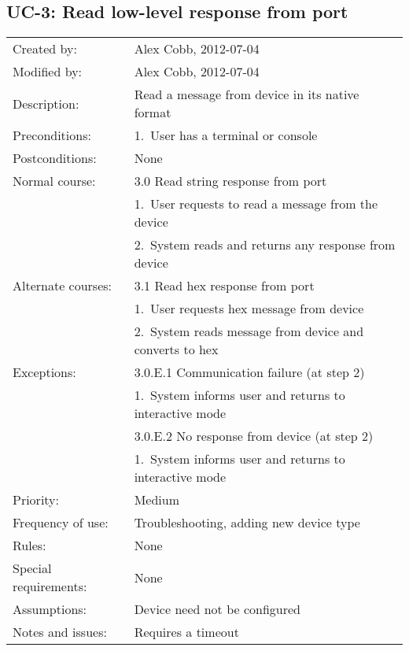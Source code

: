\documentclass[pdftex,oneside,12pt,a4paper]{book}
\begin{document}
\subsection{UC-3: Read low-level response from port}
\begin{tabular}{|l|p{10cm}|}\hline
Created by: & Alex Cobb, 2012-07-04 \\
Modified by: & Alex Cobb, 2012-07-04 \\\hline
Description: & Read a message from device in its native format \\\hline
Preconditions: & 1.\ User has a terminal or console \\\hline
Postconditions: & None \\\hline
Normal course: & 3.0 Read string response from port\\
 & 1.\ User requests to read a message from the device \\
 & 2.\ System reads and returns any response from device\\\hline
Alternate courses: & 3.1 Read hex response from port\\
 & 1.\ User requests hex message from device \\
 & 2.\ System reads message from device and converts to hex\\\hline
Exceptions: & 3.0.E.1 Communication failure (at step 2)\\
 & 1.\ System informs user and returns to interactive mode\\\cline{2-2}
 & 3.0.E.2 No response from device (at step 2)\\
 & 1.\ System informs user and returns to interactive mode\\\hline
Priority: & Medium \\\hline
Frequency of use: & Troubleshooting, adding new device type\\\hline
Rules: & None\\\hline
Special requirements: & None\\\hline
Assumptions: & Device need not be configured\\\hline
Notes and issues: & Requires a timeout\\\hline
\end{tabular}
\end{document}
